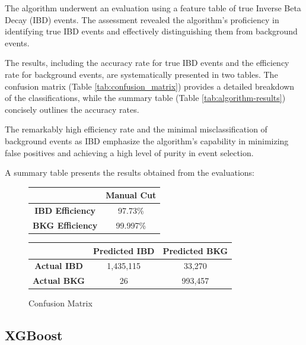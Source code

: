 The algorithm underwent an evaluation using a feature table of true Inverse Beta Decay (IBD) events. The assessment revealed the algorithm's proficiency in identifying true IBD events and effectively distinguishing them from background events.

The results, including the accuracy rate for true IBD events and the efficiency rate for background events, are systematically presented in two tables. The confusion matrix (Table \ref{tab:confusion_matrix}) provides a detailed breakdown of the classifications, while the summary table (Table \ref{tab:algorithm-results}) concisely outlines the accuracy rates.

The remarkably high efficiency rate and the minimal misclassification of background events as IBD emphasize the algorithm's capability in minimizing false positives and achieving a high level of purity in event selection.
       

A summary table presents the results obtained from the evaluations:


\begin{figure}[h]
	\centering
	\hspace{-4cm}
	\begin{minipage}{0.3\textwidth}
		\begin{tabular}{cc}
			\toprule
			 & \textbf{Manual Cut} \\ 
			\midrule
			\textbf{IBD Efficiency} &  97.73\% \\ 
			\textbf{BKG Efficiency} &  99.997\% \\ 
			\bottomrule
		\end{tabular}
	\end{minipage}
\hspace{2cm}
	\begin{minipage}{0.5\textwidth}
		\centering
		\begin{tabular}{ccc}
			\toprule
			& \textbf{Predicted IBD} & \textbf{Predicted BKG} \\
			\midrule
			\textbf{Actual IBD} & 1,435,115 & 33,270 \\
			\textbf{Actual BKG} & 26 & 993,457 \\
			\bottomrule
		\end{tabular}
		\caption{Confusion Matrix}
	\label{tab:confusion_matrix_cut}
	\end{minipage}
	\hspace{-2cm}
\end{figure}

\subsection{XGBoost}

